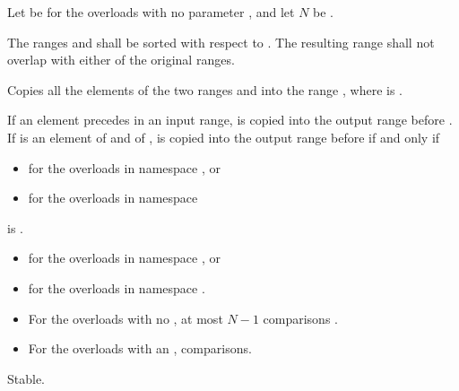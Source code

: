 \begin{itemdescr}
\begin{addedblock}
\pnum
Let  be  for the overloads with no parameter
, and let $N$ be .
\end{addedblock}

\pnum
\requires The ranges  and  shall be
sorted with respect to  .
The resulting range shall not overlap with either of the original ranges.

\pnum
\effects Copies all the elements of the two ranges  and
 into the range , where
 is
.
\begin{addedblock}
If an element  precedes  in an input range,  is
copied into the output range before . If  is an element of
 and  of ,  is
copied into the output range before  if and only if
\begin{itemize}
\item {} for the overloads in namespace , or
\item {}
  for the overloads in namespace 
\end{itemize}
is .
\end{addedblock}

\pnum
\returns {}
\begin{addedblock}
\begin{itemize}
\item {} for the overloads in namespace , or
\item {} for the overloads in
  namespace .
\end{itemize}
\end{addedblock}

\pnum
\complexity {}
\begin{itemize}
\item For the overloads with no ,
  at most $N - 1$ comparisons .
\item For the overloads with an ,
   comparisons.
\end{itemize}

\pnum
\remarks Stable.
\end{itemdescr}


